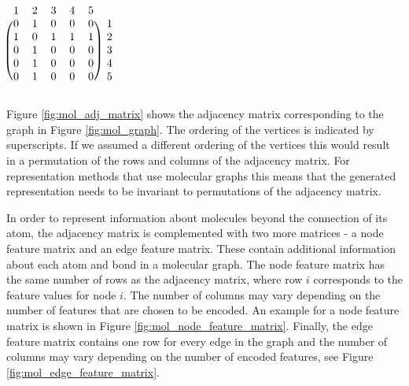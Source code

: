 \begin{minipage}{0.5\textwidth}
	\centering
	\label{fig:mol_graph}
\end{minipage}
\begin{minipage}{0.5\textwidth}
	\centering
	$
	\begin{blockarray}{cccccc}
	1 & 2 & 3 & 4 & 5 \\
	\begin{block}{(ccccc)c}
	0 & 1 & 0 & 0 & 0 & 1 \\
	1 & 0 & 1 & 1 & 1 & 2 \\
	0 & 1 & 0 & 0 & 0 & 3 \\
	0 & 1 & 0 & 0 & 0 & 4 \\
	0 & 1 & 0 & 0 & 0 & 5 \\
	\end{block}
	\end{blockarray}
	$
	\label{fig:mol_adj_matrix}
\end{minipage}
\newline\newline
Figure \ref{fig:mol_adj_matrix} shows the adjacency matrix corresponding to the graph in Figure \ref{fig:mol_graph}. The ordering of the vertices is indicated by superscripts. If we assumed a different ordering of the vertices this would result in a permutation of the rows and columns of the adjacency matrix. For representation methods that use molecular graphs this means that the generated representation needs to be invariant to permutations of the adjacency matrix.

In order to represent information about molecules beyond the connection of its atom, the adjacency matrix is complemented with two more matrices - a node feature matrix and an edge feature matrix. These contain additional information about each atom and bond in a molecular graph. The node feature matrix has the same number of rows as the adjacency matrix, where row $i$ corresponds to the feature values for node $i$. The number of columns may vary depending on the number of features that are chosen to be encoded. An example for a node feature matrix is shown in Figure \ref{fig:mol_node_feature_matrix}. Finally, the edge feature matrix contains one row for every edge in the graph and the number of columns may vary depending on the number of encoded features, see Figure \ref{fig:mol_edge_feature_matrix}.


